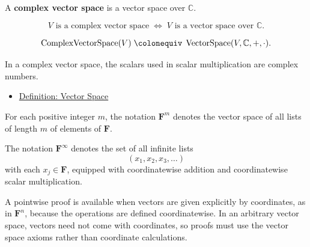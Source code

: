 
\begin{tcolorbox}[colback=defbox, colframe=defborder, arc=2pt,
  left=6pt, right=6pt, top=4pt, bottom=4pt,
  title={\small\textbf{Definition (Complex Vector Space)}},
  fonttitle=\small\bfseries]
\begin{definition}
\label{def:complex-vector-space}
A \textbf{complex vector space} is a vector space over $\mathbb{C}$.
\end{definition}
\end{tcolorbox}

\begin{remark*}
\[
V \text{ is a complex vector space}
\;\Longleftrightarrow\;
V \text{ is a vector space over } \mathbb{C}.
\]
\end{remark*}

\begin{remark*}
\[
\operatorname{ComplexVectorSpace}(V)
\;\colonequiv\;
\operatorname{VectorSpace}(V,\mathbb{C},+,\cdot).
\]
\end{remark*}

\begin{remark*}[Interpretation]
In a complex vector space, the scalars used in scalar multiplication are complex numbers.
\end{remark*}

\begin{remark*}[Dependencies]
\begin{itemize}
  \item \hyperref[def:vector-space]{Definition: Vector Space}
\end{itemize}
\end{remark*}

\begin{remark*}[Notation]
For each positive integer $m$, the notation $\mathbf{F}^m$ denotes the vector
space of all lists of length $m$ of elements of $\mathbf{F}$.

The notation $\mathbf{F}^{\infty}$ denotes the set of all infinite lists
\[
(x_1,x_2,x_3,\dots)
\]
with each $x_j \in \mathbf{F}$, equipped with coordinatewise addition and
coordinatewise scalar multiplication.
\end{remark*}

\begin{remark*}
A pointwise proof is available when vectors are given explicitly by coordinates, as in $\mathbf{F}^n$, because the operations are defined coordinatewise. In an arbitrary vector space, vectors need not come with coordinates, so proofs must use the vector space axioms rather than coordinate calculations.
\end{remark*}

